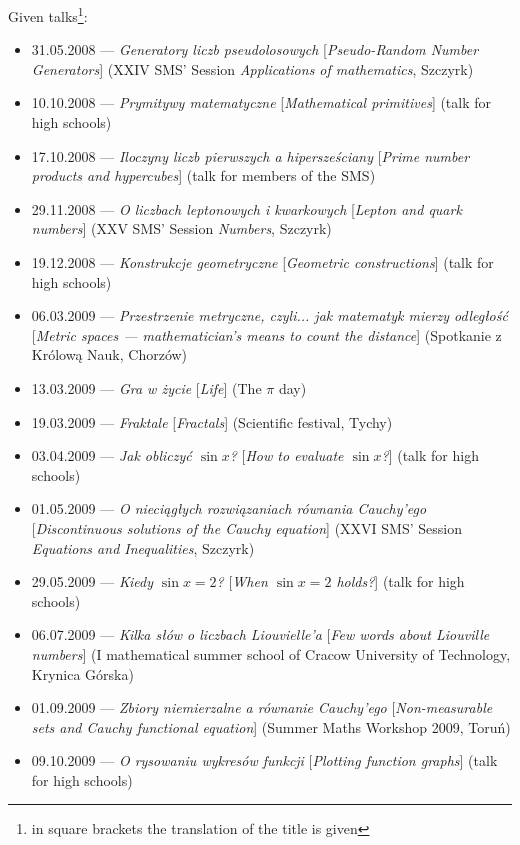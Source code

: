 \noindent Given talks\footnote{in square brackets the translation of the title is given}:
\begin{itemize}
  \item 31.05.2008 --- \textsl{Generatory liczb pseudolosowych} [\textsl{Pseudo-Random Number Generators}] (XXIV SMS' Session \textsl{Applications of mathematics}, Szczyrk)
  \item 10.10.2008 --- \textsl{Prymitywy matematyczne} [\textsl{Mathematical primitives}] (talk for high schools)
  \item 17.10.2008 --- \textsl{Iloczyny liczb pierwszych a hipersześciany} [\textsl{Prime number products and hypercubes}] (talk for members of the SMS)
  \item 29.11.2008 --- \textsl{O liczbach leptonowych i kwarkowych} [\textsl{Lepton and quark numbers}] (XXV SMS' Session \textsl{Numbers}, Szczyrk)
  \item 19.12.2008 --- \textsl{Konstrukcje geometryczne} [\textsl{Geometric constructions}] (talk for high schools)
  \item 06.03.2009 --- \textsl{Przestrzenie metryczne, czyli... jak matematyk mierzy odległość} [\textsl{Metric spaces --- mathematician's means to count the distance}] (Spotkanie z Królową Nauk, Chorzów)
  \item 13.03.2009 --- \textsl{Gra w życie} [\textsl{Life}] (The $\pi$ day)
  \item 19.03.2009 --- \textsl{Fraktale} [\textsl{Fractals}] (Scientific festival, Tychy)
  \item 03.04.2009 --- \textsl{Jak obliczyć $\sin x$?} [\textsl{How to evaluate $\sin x$?}] (talk for high schools)
  \item 01.05.2009 --- \textsl{O nieciągłych rozwiązaniach równania Cauchy'ego} [\textsl{Discontinuous solutions of the Cauchy equation}] (XXVI SMS' Session \textsl{Equations and Inequalities}, Szczyrk)
  \item 29.05.2009 --- \textsl{Kiedy $\sin x=2$?} [\textsl{When $\sin x=2$ holds?}] (talk for high schools)
  \item 06.07.2009 --- \textsl{Kilka słów o liczbach Liouvielle'a} [\textsl{Few words about Liouville numbers}] (I mathematical summer school of Cracow University of Technology, Krynica Górska)
  \item 01.09.2009 --- \textsl{Zbiory niemierzalne a równanie Cauchy'ego} [\textsl{Non-measurable sets and Cauchy functional equation}] (Summer Maths Workshop 2009, Toruń)
  \item 09.10.2009 --- \textsl{O rysowaniu wykresów funkcji} [\textsl{Plotting function graphs}] (talk for high schools)

\end{itemize}
